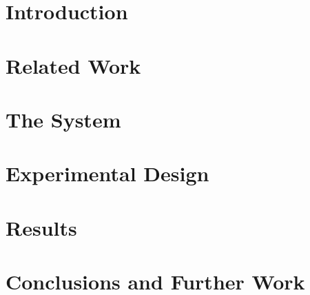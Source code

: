 \section{Introduction}

\section{Related Work}

\section{The System}
\label{sec:system}

\section{Experimental Design}
\label{sec:experiment}

\section{Results}
\label{sec:result}

\section{Conclusions and Further Work}






